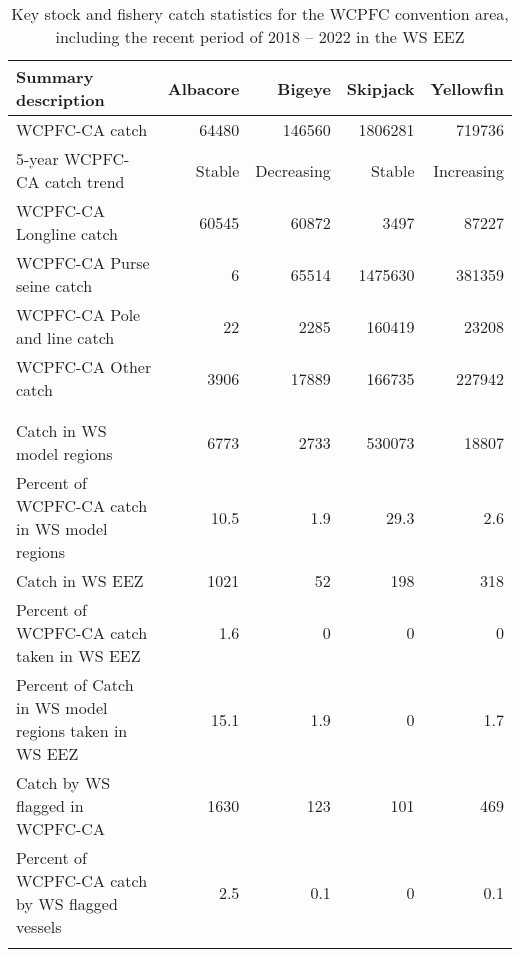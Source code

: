 \begin{longtable}{lrrrr}
\caption{Key stock and fishery catch statistics for the WCPFC convention area, including the recent period of 2018 -- 2022 in the WS EEZ} \\ 
  \hline
Summary description & Albacore & Bigeye & Skipjack & Yellowfin \\ 
  \hline
WCPFC-CA catch & 64480 & 146560 & 1806281 & 719736 \\ 
  5-year WCPFC-CA catch trend & Stable & Decreasing & Stable & Increasing \\ 
  WCPFC-CA Longline catch & 60545 & 60872 & 3497 & 87227 \\ 
  WCPFC-CA Purse seine catch & 6 & 65514 & 1475630 & 381359 \\ 
  WCPFC-CA Pole and line catch & 22 & 2285 & 160419 & 23208 \\ 
  WCPFC-CA Other catch & 3906 & 17889 & 166735 & 227942 \\ 
   &  &  &  &  \\ 
   &  &  &  &  \\ 
   \hline
Catch in WS model regions & 6773 & 2733 & 530073 & 18807 \\ 
  Percent of WCPFC-CA catch in WS model regions & 10.5 & 1.9 & 29.3 & 2.6 \\ 
  Catch in WS EEZ & 1021 & 52 & 198 & 318 \\ 
  Percent of WCPFC-CA catch taken in WS EEZ & 1.6 & 0 & 0 & 0 \\ 
  Percent of Catch in WS model regions taken in WS EEZ & 15.1 & 1.9 & 0 & 1.7 \\ 
  Catch by WS flagged in WCPFC-CA & 1630 & 123 & 101 & 469 \\ 
  Percent of WCPFC-CA catch by WS flagged vessels & 2.5 & 0.1 & 0 & 0.1 \\ 
  \hline
\label{cat_sum_tab}
\end{longtable}
